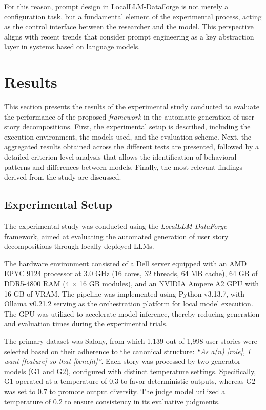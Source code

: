 \documentclass[pdflatex,sn-mathphys-num]{sn-jnl}%
\theoremstyle{thmstyleone}%
\theoremstyle{thmstyletwo}%
\theoremstyle{thmstylethree}%
\begin{document}
For this reason, prompt design in LocalLLM-DataForge is not merely a configuration task, but a fundamental element of the experimental process, acting as the control interface between the researcher and the model. This perspective aligns with recent trends that consider prompt engineering as a key abstraction layer in systems based on language models.

\section{Results}\label{sec4}

This section presents the results of the experimental study conducted to evaluate the performance of the proposed \textit{framework} in the automatic generation of user story decompositions. First, the experimental setup is described, including the execution environment, the models used, and the evaluation scheme. Next, the aggregated results obtained across the different tests are presented, followed by a detailed criterion-level analysis that allows the identification of behavioral patterns and differences between models. Finally, the most relevant findings derived from the study are discussed.

\subsection{Experimental Setup}

The experimental study was conducted using the \textit{LocalLLM-DataForge} framework, aimed at evaluating the automated generation of user story decompositions through locally deployed LLMs.

The hardware environment consisted of a Dell server equipped with an AMD EPYC 9124 processor at 3.0 GHz (16 cores, 32 threads, 64 MB cache), 64 GB of DDR5-4800 RAM (4 $\times$ 16 GB modules), and an NVIDIA Ampere A2 GPU with 16 GB of VRAM. The pipeline was implemented using Python v3.13.7, with Ollama v0.21.2 serving as the orchestration platform for local model execution. The GPU was utilized to accelerate model inference, thereby reducing generation and evaluation times during the experimental trials.

The primary dataset was Salony, from which 1,139 out of 1,998 user stories were selected based on their adherence to the canonical structure: \textit{“As a(n) [role], I want [feature] so that [benefit]”}. Each story was processed by two generator models (G1 and G2), configured with distinct temperature settings. Specifically, G1 operated at a temperature of 0.3 to favor deterministic outputs, whereas G2 was set to 0.7 to promote output diversity. The judge model utilized a temperature of 0.2 to ensure consistency in its evaluative judgments.
\end{document}
